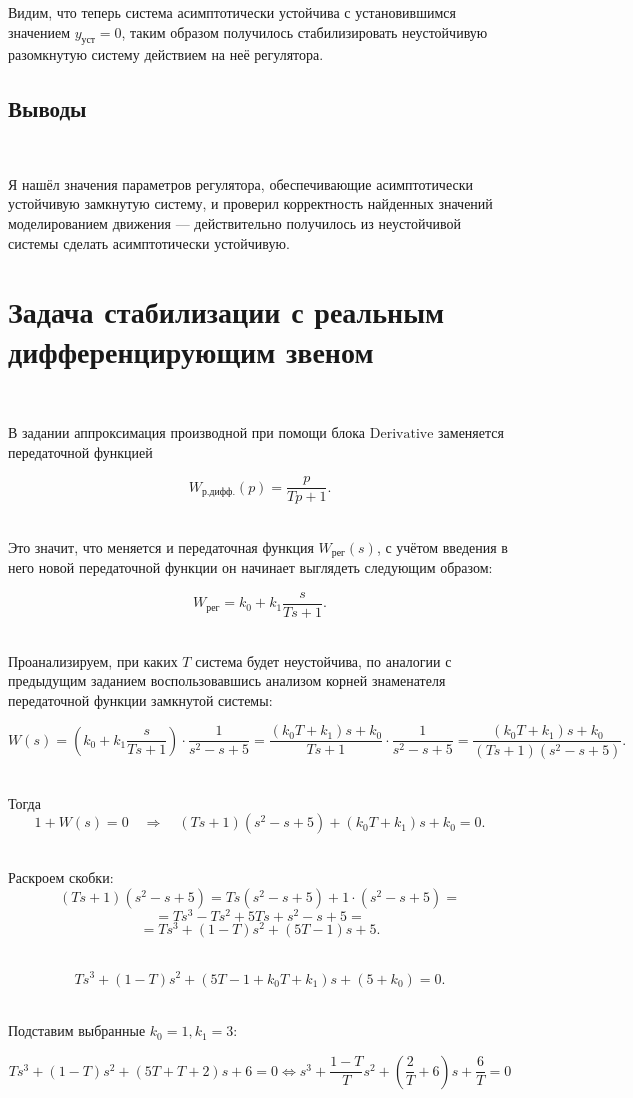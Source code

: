 \documentclass[a4paper]{article}
\begin{document}
Видим, что теперь система асимптотически устойчива с установившимся значением $y_{\text{уст}} = 0$, таким образом получилось стабилизировать неустойчивую разомкнутую систему действием на неё регулятора.

\subsection{Выводы}\

Я нашёл значения параметров регулятора, обеспечивающие асимптотически устойчивую замкнутую систему, и проверил корректность найденных значений моделированием движения --- действительно получилось из неустойчивой системы сделать асимптотически устойчивую.

\section{Задача стабилизации с реальным дифференцирующим звеном}\

В задании аппроксимация производной при помощи блока $\text{Derivative}$ заменяется передаточной функцией

$$
W_{\text{р.дифф.}}(p) = \frac{p}{Tp+1}.
$$\

Это значит, что меняется и передаточная функция $W_{\text{рег}}(s)$, с учётом введения в него новой передаточной функции он начинает выглядеть следующим образом:

$$
W_{\text{рег}} = k_0+k_1\frac{s}{Ts+1}.
$$\ 

Проанализируем, при каких $T$ система будет неустойчива, по аналогии с предыдущим заданием воспользовавшись анализом корней знаменателя передаточной функции замкнутой системы:

$$
W(s) = \left(k_0 + k_1 \frac{s}{T s + 1}\right) \cdot \frac{1}{s^2 - s + 5} = \frac{(k_0 T + k_1)s + k_0}{T s + 1}\cdot \frac{1}{s^2 - s + 5} = \frac{(k_0 T + k_1)s + k_0}{(T s + 1)(s^2 - s + 5)}.
$$\

Тогда
$$
1 + W(s) = 0 \quad \Rightarrow \quad (T s + 1)(s^2 - s + 5) + (k_0 T + k_1)s + k_0 = 0.
$$\ 

Раскроем скобки:  
$$
(T s + 1)(s^2 - s + 5) = T s(s^2 - s + 5) + 1\cdot(s^2 - s + 5)=
$$
$$
= T s^3 - T s^2 + 5T s + s^2 - s + 5=
$$
$$
= T s^3 + (1 - T)s^2 + (5T - 1)s + 5.
$$\

$$
T s^3 + (1-T)s^2 + (5T - 1 + k_0 T + k_1)s + (5 + k_0) = 0.
$$\ 

Подставим выбранные $k_0 = 1, k_1 = 3$:

$$
T s^3 + (1-T)s^2 + (5T + T + 2)s + 6 = 0 \Leftrightarrow s^3 + \frac{1-T}{T}s^2 + \left(\frac{2}{T} + 6\right)s + \frac{6}{T} = 0
$$\
\end{document}
